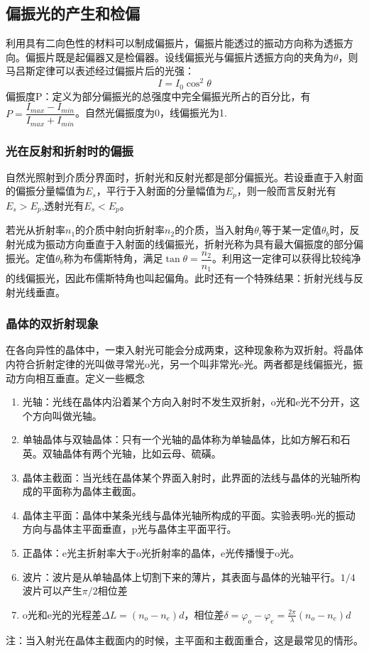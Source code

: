 \subsection{偏振光的产生和检偏}
利用具有二向色性的材料可以制成偏振片，偏振片能透过的振动方向称为透振方向。偏振片既是起偏器又是检偏器。设线偏振光与偏振片透振方向的夹角为$\theta$，则马吕斯定律可以表述经过偏振片后的光强：
\begin{equation}
    I=I_0\cos ^2 \theta
\end{equation}
偏振度P：定义为部分偏振光的总强度中完全偏振光所占的百分比，有$P=\dfrac{I_{max}-I_{min}}{I_{max}+I_{min}}$。自然光偏振度为0，线偏振光为1.
\subsubsection{光在反射和折射时的偏振}
自然光照射到介质分界面时，折射光和反射光都是部分偏振光。若设垂直于入射面的偏振分量幅值为$E_s$，平行于入射面的分量幅值为$E_p$，则一般而言反射光有$E_s>E_p$,透射光有$E_s<E_p$。

若光从折射率$n_1$的介质中射向折射率$n_2$的介质，当入射角$\theta_i$等于某一定值$\theta_b$时，反射光成为振动方向垂直于入射面的线偏振光，折射光称为具有最大偏振度的部分偏振光。定值$\theta_b$称为布儒斯特角，满足$\tan \theta =\dfrac{n_2}{n_1}$。利用这一定律可以获得比较纯净的线偏振光，因此布儒斯特角也叫起偏角。此时还有一个特殊结果：折射光线与反射光线垂直。
\subsubsection{晶体的双折射现象}
在各向异性的晶体中，一束入射光可能会分成两束，这种现象称为双折射。将晶体内符合折射定律的光叫做寻常光o光，另一个叫非常光e光。两者都是线偏振光，振动方向相互垂直。定义一些概念
\begin{enumerate}
    \item 光轴：光线在晶体内沿着某个方向入射时不发生双折射，o光和e光不分开，这个方向叫做光轴。
    \item 单轴晶体与双轴晶体：只有一个光轴的晶体称为单轴晶体，比如方解石和石英。双轴晶体有两个光轴，比如云母、硫磺。
    \item 晶体主截面：当光线在晶体某个界面入射时，此界面的法线与晶体的光轴所构成的平面称为晶体主截面。
    \item 晶体主平面：晶体中某条光线与晶体光轴所构成的平面。实验表明o光的振动方向与晶体主平面垂直，p光与晶体主平面平行。
    \item 正晶体：e光主折射率大于o光折射率的晶体，e光传播慢于o光。
    \item 波片：波片是从单轴晶体上切割下来的薄片，其表面与晶体的光轴平行。$1/4$波片可以产生$\pi /2$相位差
    \item o光和e光的光程差$\Delta L=(n_o-n_e)d$，相位差$\delta = \varphi_o -\varphi_e = \frac{2 \pi}{\lambda} (n_o -n_e)d$    
\end{enumerate}
注：当入射光在晶体主截面内的时候，主平面和主截面重合，这是最常见的情形。


